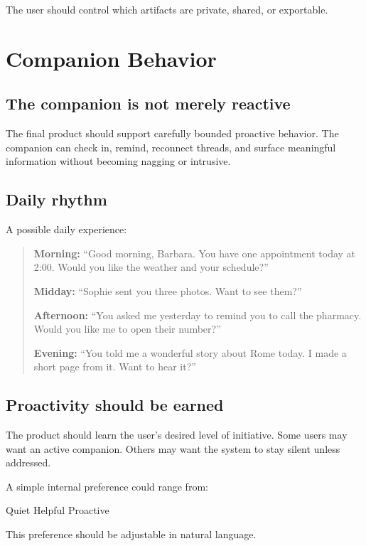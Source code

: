 \documentclass[11pt]{article}
\begin{document}
The user should control which artifacts are private, shared, or exportable.

\section{Companion Behavior}

\subsection{The companion is not merely reactive}
The final product should support carefully bounded proactive behavior. The companion can check in, remind, reconnect threads, and surface meaningful information without becoming nagging or intrusive.

\subsection{Daily rhythm}
A possible daily experience:

\begin{quote}
\textbf{Morning:} ``Good morning, Barbara. You have one appointment today at 2:00. Would you like the weather and your schedule?''

\textbf{Midday:} ``Sophie sent you three photos. Want to see them?''

\textbf{Afternoon:} ``You asked me yesterday to remind you to call the pharmacy. Would you like me to open their number?''

\textbf{Evening:} ``You told me a wonderful story about Rome today. I made a short page from it. Want to hear it?''
\end{quote}

\subsection{Proactivity should be earned}
The product should learn the user's desired level of initiative. Some users may want an active companion. Others may want the system to stay silent unless addressed.

A simple internal preference could range from:

\begin{center}
Quiet \hspace{1.5cm} Helpful \hspace{1.5cm} Proactive
\end{center}

This preference should be adjustable in natural language.
\end{document}
